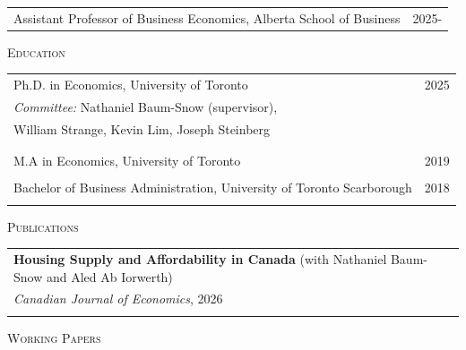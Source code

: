 \documentclass[11pt]{amsart}
\begin{document}
\normalsize
\begin{tabular}{ p{12.5cm}  p{5cm}}
	\large{Assistant Professor of Business Economics, Alberta School of Business}  & 2025-  \\
 
\end{tabular}

\vspace{0.2cm}

\LARGE
\textsc{Education}
\vspace{0.2cm}

\normalsize
\begin{tabular}{ p{12.5cm}  p{5cm}}
  \large{Ph.D. in Economics, University of Toronto}  & 2025  \\
   \multicolumn{2}{l}{ \hspace{.75cm}  \emph{Committee:}  Nathaniel Baum-Snow (supervisor), } \\
     \hspace{2.8cm}  William Strange, Kevin Lim, Joseph Steinberg  \\
 \hspace{2.90cm}   \\
  \\
  \large{M.A in Economics, University of Toronto}    & 2019            \\
   \\
  \large{Bachelor of Business Administration, University of Toronto Scarborough}   & 2018            \\
                                                     &                 
\end{tabular}

\vspace{0.2cm}


\LARGE
\textsc{Publications}
\vspace{0.2cm}
\normalsize

\begin{tabular}{ p{15.5cm}}
	\textbf{Housing Supply and Affordability in Canada} (with Nathaniel Baum-Snow and Aled Ab Iorwerth) \\ 
	\textit{Canadian Journal of Economics}, 2026                         \\
	\normalsize
\end{tabular}

\vspace{0.2cm}


\LARGE
\textsc{Working Papers}
\vspace{0.2cm}
\normalsize
\end{document}
